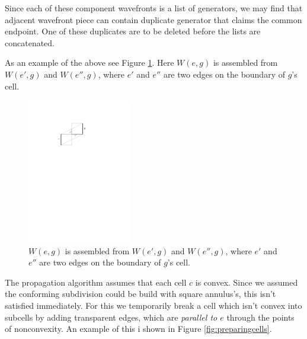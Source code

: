 Since each of these component wavefronts is a list of generators, we may find that adjacent wavefront 
piece can contain duplicate generator that claims the common endpoint. One of these duplicates are to be 
deleted before the lists are concatenated.

As an example of the above see Figure \ref{fig:weg}. Here $W(e,g)$ is assembled from $W(e',g)$ and 
$W(e'',g)$, where $e'$ and $e''$ are two edges on the boundary of $g$'s cell.

\begin{figure}[H]
	\centering
	\includegraphics[width=0.4\textwidth]{figures/weg.pdf}
	\caption{$W(e,g)$ is assembled from $W(e',g)$ and $W(e'',g)$, where $e'$ and $e''$ are two edges on 
    		 the boundary of $g$'s cell\cite{HershbergerS99}.}
	\label{fig:weg}
\end{figure}

The propagation algorithm assumes that each cell $c$ is convex. Since we assumed the 
conforming subdivision could be build with square annulus's, this isn't satisfied immediately. For this we 
temporarily break a cell which isn't convex into subcells by adding transparent edges, which are 
\textit{parallel to $e$} through the points of nonconvexity. An example of this i shown in Figure 
\ref{fig:preparingcells}.

